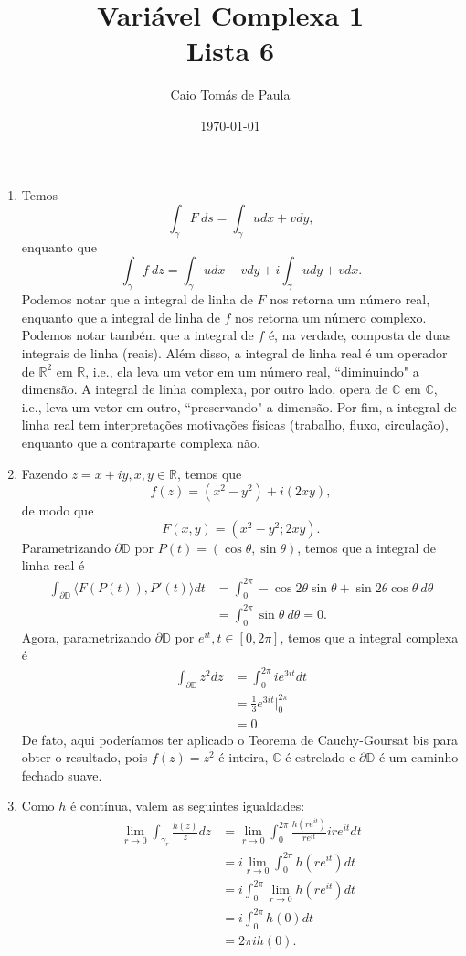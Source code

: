 \documentclass[12pt,a4paper]{article}
\title{\textbf{Variável Complexa 1}\\ Lista 6}
\author{Caio Tomás de Paula}
\date{\today}
\begin{document}
	\maketitle
	\begin{enumerate}		
		\item Temos
		$$
		\int_{\gamma}F \ ds = \int_{\gamma} u dx + v dy, 
		$$
		enquanto que
		$$
		\int_{\gamma}f \ dz = \int_{\gamma} udx - vdy + i\int_{\gamma} udy+vdx.
		$$
		Podemos notar que a integral de linha de $F$ nos retorna um número real, enquanto que a integral de linha de $f$ nos retorna um número complexo. Podemos notar também que a integral de $f$ é, na verdade, composta de duas integrais de linha (reais). Além disso, a integral de linha real é um operador de $\mathbb{R}^2$ em $\mathbb{R}$, i.e., ela leva um vetor em um número real, ``diminuindo" a dimensão. A integral de linha complexa, por outro lado, opera de $\mathbb{C}$ em $\mathbb{C}$, i.e., leva um vetor em outro, ``preservando" a dimensão. Por fim, a integral de linha real tem interpretações motivações físicas (trabalho, fluxo, circulação), enquanto que a contraparte complexa não.
		
		\item Fazendo $z = x+iy, x,y\in\mathbb{R}$, temos que
		$$
		f(z) = (x^2 - y^2) + i(2xy),
		$$
		de modo que
		$$
		F(x,y) = \left( x^2 - y^2; 2xy \right).
		$$
		Parametrizando $\partial\mathbb{D}$ por $P(t) = (\cos\theta, \sin\theta)$, temos que a integral de linha real é
		\begin{align*}
		\int_{\partial\mathbb{D}} \langle F(P(t)), P'(t) \rangle dt &= \int_{0}^{2\pi}-\cos 2\theta\sin\theta + \sin 2\theta\cos\theta \ d\theta \\
		&= \int_{0}^{2\pi}\sin\theta \ d\theta = 0.
		\end{align*} 
		Agora, parametrizando $\partial\mathbb{D}$ por $e^{it}, t\in[0,2\pi]$, temos que a integral complexa é
		\begin{align*}
		\int_{\partial\mathbb{D}} z^2dz &= \int_{0}^{2\pi} ie^{3it}dt \\ 
		&= \frac{1}{3}e^{3it}\Bigg|_{0}^{2\pi} \\
		&= 0. 
		\end{align*}
		De fato, aqui poderíamos ter aplicado o Teorema de Cauchy-Goursat bis para obter o resultado, pois $f(z) = z^2$ é inteira, $\mathbb{C}$ é estrelado e $\partial\mathbb{D}$ é um caminho fechado suave.
		
		\item Como $h$ é contínua, valem as seguintes igualdades:
		\begin{align*}
		\lim\limits_{r\to 0}\int_{\gamma_r}\frac{h(z)}{z}dz &= \lim\limits_{r\to 0}\int_{0}^{2\pi}\frac{h(re^{it})}{re^{it}}ire^{it}dt \\
		&= i\lim\limits_{r\to 0}\int_{0}^{2\pi}h(re^{it})dt \\
		&= i\int_{0}^{2\pi}\lim\limits_{r\to 0}h(re^{it})dt \\
		&= i\int_{0}^{2\pi}h(0)dt \\
		&= 2\pi ih(0).
		\end{align*}
		

\end{enumerate}
\end{document}
